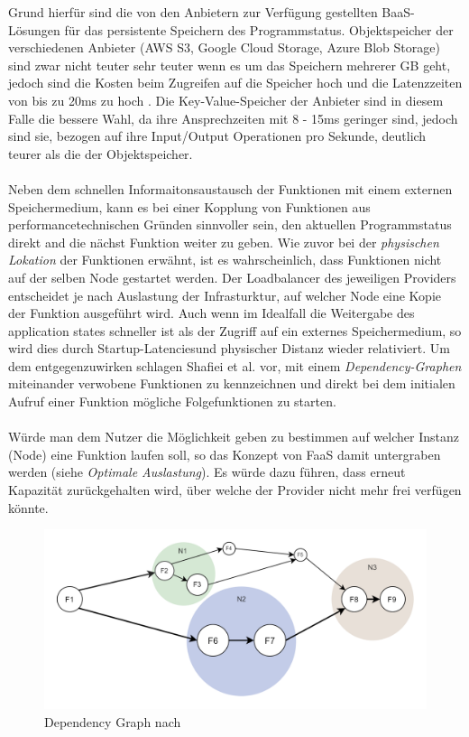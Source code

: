 \documentclass[11pt]{article}
\begin{document}
Grund hierfür sind die von den Anbietern zur Verfügung gestellten BaaS-Lösungen für das persistente Speichern des Programmstatus. Objektspeicher der verschiedenen Anbieter (AWS S3, Google Cloud Storage, Azure Blob Storage) sind zwar nicht teuter sehr teuter wenn es um das Speichern mehrerer GB geht, jedoch sind die Kosten beim Zugreifen auf die Speicher hoch und die Latenzzeiten von bis zu 20ms zu hoch \cite{jonas2019cloud}. Die Key-Value-Speicher der Anbieter sind in diesem Falle die bessere Wahl, da ihre Ansprechzeiten mit 8 - 15ms geringer sind, jedoch sind sie, bezogen auf ihre Input/Output Operationen pro Sekunde, deutlich teurer als die der Objektspeicher.\\\\
Neben dem schnellen Informaitonsaustausch der Funktionen mit einem externen Speichermedium, kann es bei einer Kopplung von Funktionen aus performancetechnischen Gründen sinnvoller sein, den aktuellen Programmstatus direkt and die nächst Funktion weiter zu geben. Wie zuvor bei der \textit{physischen Lokation} der Funktionen erwähnt, ist es wahrscheinlich, dass Funktionen nicht auf der selben Node gestartet werden. Der Loadbalancer des jeweiligen Providers entscheidet je nach Auslastung der Infrasturktur, auf welcher Node eine Kopie der Funktion ausgeführt wird. Auch wenn im Idealfall die Weitergabe des \glqq application states\grqq{} schneller ist als der Zugriff auf ein externes Speichermedium, so wird dies durch \glqq Startup-Latencies\grqq{}und physischer Distanz wieder relativiert. Um dem entgegenzuwirken schlagen Shaﬁei et al. \cite{shafiei2020serverless} vor, mit einem \textit{Dependency-Graphen} miteinander verwobene Funktionen zu kennzeichnen und direkt bei dem initialen Aufruf einer Funktion mögliche Folgefunktionen zu starten.\\\\
Würde man dem Nutzer die Möglichkeit geben zu bestimmen auf welcher Instanz (Node) eine Funktion laufen soll, so das Konzept von FaaS damit untergraben werden (siehe \textit{Optimale Auslastung}). Es würde dazu führen, dass erneut Kapazität zurückgehalten wird, über welche der Provider nicht mehr frei verfügen könnte. 
\begin{figure}[H]
\caption{Dependency Graph nach \cite{shafiei2020serverless}}
\label{fig:dependencyGraph}
\centering
\includegraphics[width=1\textwidth]{DependencyGraph}
\end{figure} 
\end{document}

